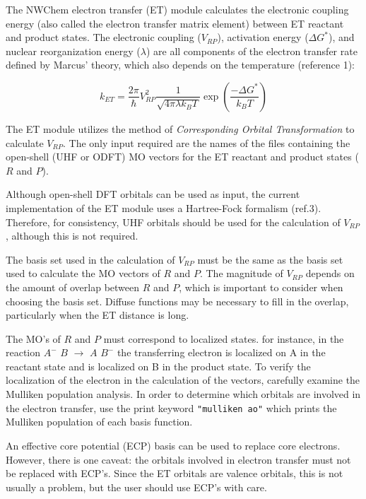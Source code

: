 %
%
\label{sec:etrans}

The NWChem electron transfer (ET) module calculates the electronic coupling energy (also called the electron transfer
matrix element) between ET reactant and product states.  The electronic coupling ($V_{RP}$), activation energy ($\Delta G^{*}$),
and nuclear reorganization energy ($\lambda$) are all components of the electron transfer rate defined by Marcus' theory, which
also depends on the temperature (reference 1):

\begin{equation}
{k_{ET}}=
\frac{2\pi}{\hbar}
V_{RP}^{2}
\frac{1}{\sqrt{4\pi \lambda k_{B}T}}
\exp \left( \frac{- \Delta G^{*}}{k_{B} T} \right)
\end{equation}

The ET module utilizes the method of {\em Corresponding Orbital Transformation} to calculate $V_{RP}$.
The only input required are the names
of the files containing the open-shell (UHF or ODFT) MO vectors for the ET reactant and product states ($R$ and $P$).

Although open-shell DFT orbitals can be used as input, the current implementation of the ET module uses a Hartree-Fock 
formalism (ref.3).  Therefore, for consistency, UHF orbitals should be used for the calculation of $V_{RP}$, although this
is not required.

The basis set used in the calculation of $V_{RP}$ must be the same as the basis set used to calculate the MO vectors of
$R$ and $P$.  The magnitude of $V_{RP}$ depends on the amount of overlap between $R$ and $P$,
which is important to consider when choosing the basis set.  Diffuse functions may be
necessary to fill in the overlap, particularly when the ET distance is long.

The MO's of $R$ and $P$ must correspond to localized states.  for instance, in the reaction $A^{ -}$ $B$ $\rightarrow$ $A$ $B^{ -}$
the transferring electron is localized on A in the reactant state and is localized on B in the product state.
To verify the localization of the electron in the calculation of the vectors, carefully examine the Mulliken population
analysis.  In order to determine which orbitals are involved in the electron transfer, use the print keyword \verb+"mulliken ao"+ 
which prints the Mulliken population of each basis function.

An effective core potential (ECP) basis can be used to replace core electrons.  However, there is one caveat: the orbitals
involved in electron transfer must not be replaced with ECP's.  Since the ET orbitals are valence orbitals, this is not usually
a problem, but the user should use ECP's with care.

